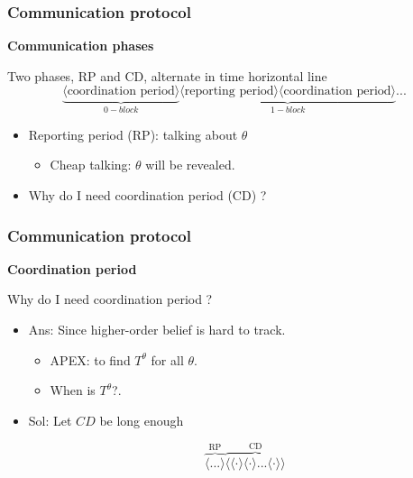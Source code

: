 \documentclass[10pt]{beamer}
\begin{document}
\begin{frame}
  \frametitle{Communication protocol}

\textbf{Communication phases}

Two phases, \alert{RP} and \alert{CD}, alternate in time horizontal line 
\[\underbrace{\langle\text{coordination period}\rangle}_{0-block}\underbrace{\langle\text{reporting period}\rangle \langle\text{coordination period}\rangle}_{1-block}...\]

\begin{itemize}
\item \alert{Reporting period (RP)}: talking about $\theta$
\begin{itemize}
\item Cheap talking: $\theta$ will be revealed.
\end{itemize}
\item Why do I need \alert{coordination period (CD)} ?


\end{itemize}


\end{frame}


\begin{frame}
  \frametitle{Communication protocol}

\textbf{Coordination period}

Why do I need coordination period ?
\begin{itemize}
\item Ans: Since higher-order belief is hard to track.

\begin{itemize}
\item APEX: to find $T^{\theta}$ for all $\theta$.
\item When is $T^{\theta}$?.
\end{itemize}
\item Sol: Let $CD$ be long enough

\[\overbrace{\langle ... \rangle}^{\text{RP}}\overbrace{\langle \langle \cdot \rangle \langle \cdot \rangle...\langle \cdot \rangle\rangle}^{\text{CD}}\] 

\end{itemize}

\end{frame}
\end{document}
